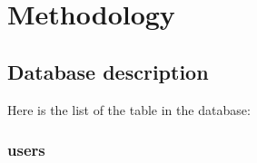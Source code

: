 \documentclass[../main.tex]{subfiles}
\begin{document}
\chapter{Methodology} %
\label{cha:methodology}

\section{Database description} %
\label{sec:database_description}


Here is the list of the table in the database:


\subsection{users} %
\label{sub:users}

\fboxsep=0mm%
\fboxrule=2pt%

\begin{figure}
  \vspace{-20pt}
  \begin{center}
  \end{center}
  \vspace{-20pt}
\end{figure}
\end{document}

